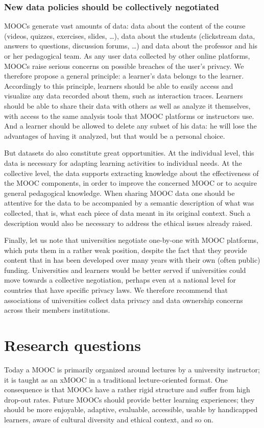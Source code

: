 \documentclass[a4paper,UKenglish]{dagman}
\begin{document}
\subsubsection*{New data policies should be collectively negotiated}
MOOCs generate vast amounts of data: data about the content of the course (videos, quizzes,
exercises, slides, \ldots), data about the students (clickstream data, answers to questions,
discussion forums, \ldots) and data about the professor and his or her pedagogical team. As any user
data collected by other online platforms, MOOCs raise serious concerns on possible breaches of the
user's privacy. We therefore propose a general principle: a learner's data belongs to the learner.
Accordingly to this principle, learners should be able to easily access and visualize any data
recorded about them, such as interaction traces.  Learners should be able to share their data with
others as well as analyze it themselves, with access to the same analysis tools that MOOC platforms
or instructors use.  And a learner should be allowed to delete any subset of his data: he will lose
the advantages of having it analyzed, but that would be a personal choice.

But datasets do also constitute great opportunities. At the individual level, this data is necessary
for adapting learning activities to individual needs. At the collective level, the data supports
extracting knowledge about the effectiveness of the MOOC components, in order to improve the
concerned MOOC or to acquire general pedagogical knowledge. When sharing MOOC data one should be
attentive for the data to be accompanied by a semantic description of what was collected, that is,
what each piece of data meant in its original context. Such a description would also be necessary to
address the ethical issues already raised.

Finally, let us note that universities negotiate one-by-one with MOOC platforms, which puts them in
a rather weak position, despite the fact that they provide content that in has been developed over
many years with their own (often public) funding.  Universities and learners would be better served
if universities could move towards a collective negotiation, perhaps even at a national level for
countries that have specific privacy laws.  We therefore recommend that associations of universities
collect data privacy and data ownership concerns across their members institutions.

\section{Research questions}
Today a MOOC is primarily organized around lectures by a university instructor; it is taught as an
xMOOC in a traditional lecture-oriented format. One consequence is that MOOCs have a rather rigid
structure and suffer from high drop-out rates.  Future MOOCs should provide better learning
experiences; they should be more enjoyable, adaptive, evaluable, accessible, usable by handicapped
learners, aware of cultural diversity and ethical context, and so on.
\end{document}
